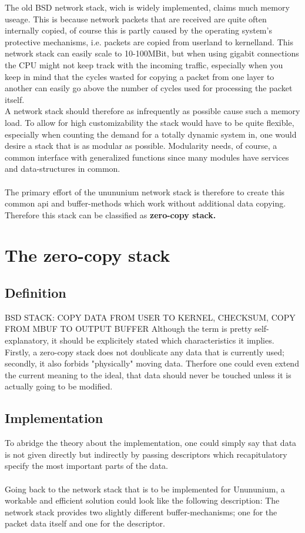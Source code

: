 \documentclass[11pt,a4paper]{article}
\begin{document}
The old BSD network stack, wich is widely implemented, claims much memory useage. This is because network packets that are received are quite often internally copied, of course this is partly caused by the operating system's protective mechanisms, i.e. packets are copied from userland to kernelland.
This network stack can easily scale to 10-100MBit, but when using gigabit connections the CPU might not keep track with the incoming traffic, especially when you keep in mind that the cycles wasted for copying a packet from one layer to another can easily go above the number of cycles used for processing the packet itself.
\\
A network stack should therefore as infrequently as possible cause such a memory load. To allow for high customizability the stack would have to be quite flexible, especially when counting the demand for a totally dynamic system in, one would desire a stack that is as modular
as possible.
Modularity needs, of course, a common interface with generalized functions since many modules have services and data-structures in common.
\\\\
The primary effort of the unununium network stack is therefore to create this common api and buffer-methods which work without additional data copying. Therefore this stack can be classified as \bf{zero-copy stack}.\rm
\section{The zero-copy stack}
\subsection{Definition}
BSD STACK: COPY DATA FROM USER TO KERNEL, CHECKSUM, COPY FROM MBUF TO OUTPUT BUFFER
Although the term is pretty self-explanatory, it should be explicitely stated which characteristics it implies. Firstly, a zero-copy stack does not doublicate any data that is currently used; secondly, it also forbids "physically" moving data. Therfore one could even extend the current meaning to the ideal, that data should never be touched unless it is actually going to be modified.
\subsection{Implementation}
To abridge the theory about the implementation, one could simply say that data is not given directly but indirectly by passing descriptors which recapitulatory specify the most important parts of the data.
\\\\
Going back to the network stack that is to be implemented for Unununium, a workable and efficient solution could look like the following description:
The network stack provides two slightly different buffer-mechanisms; one for the packet data itself and one for the descriptor. 
\end{document}

